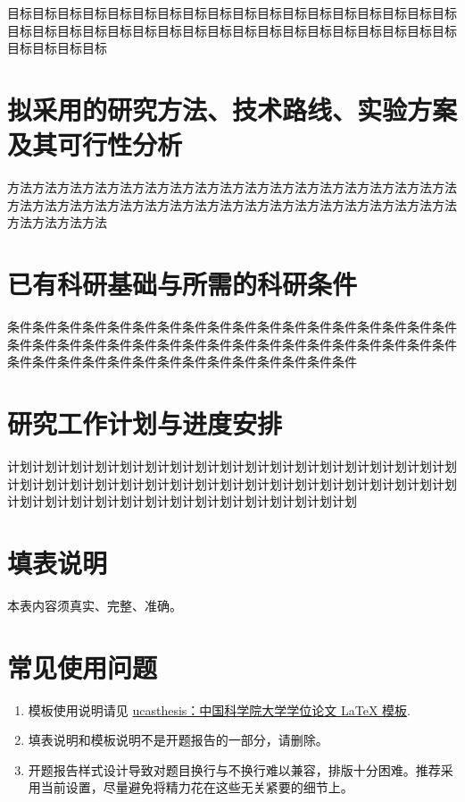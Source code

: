 目标目标目标目标目标目标目标目标目标目标目标目标目标目标目标目标目标目标目标目标目标目标目标目标目标目标目标目标目标目标目标目标目标目标目标目标目标目标目标目标

\section{拟采用的研究方法、技术路线、实验方案及其可行性分析}

方法方法方法方法方法方法方法方法方法方法方法方法方法方法方法方法方法方法方法方法方法方法方法方法方法方法方法方法方法方法方法方法方法方法方法方法方法方法方法方法

\section{已有科研基础与所需的科研条件}

条件条件条件条件条件条件条件条件条件条件条件条件条件条件条件条件条件条件条件条件条件条件条件条件条件条件条件条件条件条件条件条件条件条件条件条件条件条件条件条件条件条件条件条件条件条件条件条件条件条件

\section{研究工作计划与进度安排}

计划计划计划计划计划计划计划计划计划计划计划计划计划计划计划计划计划计划计划计划计划计划计划计划计划计划计划计划计划计划计划计划计划计划计划计划计划计划计划计划计划计划计划计划计划计划计划计划计划计划

\section*{填表说明}

本表内容须真实、完整、准确。

\section*{常见使用问题}

\begin{enumerate}
    \item 模板使用说明请见 \href{https://github.com/mohuangrui/ucasthesis}{ucasthesis：中国科学院大学学位论文 LaTeX 模板}.
    \item 填表说明和模板说明不是开题报告的一部分，请删除。
    \item 开题报告样式设计导致对题目换行与不换行难以兼容，排版十分困难。推荐采用当前设置，尽量避免将精力花在这些无关紧要的细节上。
\end{enumerate}

\nocite{*}%
